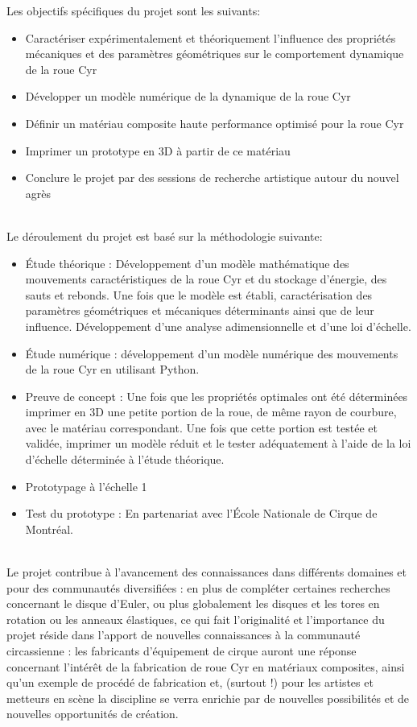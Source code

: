 Les objectifs spécifiques du projet sont les suivants:
\begin{itemize}
\item Caractériser expérimentalement et théoriquement l’influence des propriétés mécaniques et des paramètres géométriques sur le comportement dynamique de la roue Cyr
\item Développer un modèle numérique de la dynamique de la roue Cyr
\item Définir un matériau composite haute performance optimisé pour la roue Cyr
\item Imprimer un prototype en 3D à partir de ce matériau
\item Conclure le projet par des sessions de recherche artistique autour du nouvel agrès
\end{itemize}
\\
Le déroulement du projet est basé sur la méthodologie suivante:
\begin{itemize}
\item Étude théorique : Développement d’un modèle mathématique des mouvements caractéristiques de la roue Cyr et du stockage d’énergie, des sauts et rebonds. Une fois que le modèle est établi, caractérisation des paramètres géométriques et mécaniques déterminants ainsi que de leur influence. Développement d’une analyse adimensionnelle et d’une loi d’échelle.
\item Étude numérique : développement d’un modèle numérique des mouvements de la roue Cyr en utilisant Python.
\item Preuve de concept : Une fois que les propriétés optimales ont été déterminées imprimer en 3D une petite portion de la roue, de même rayon de courbure, avec le matériau correspondant. Une fois que cette portion est testée et validée, imprimer un modèle réduit et le tester adéquatement à l’aide de la loi d’échelle déterminée à l’étude théorique.
\item Prototypage à l’échelle 1
\item Test du prototype : En partenariat avec l’École Nationale de Cirque de Montréal.
\end{itemize}
\\
Le projet contribue à l’avancement des connaissances dans différents domaines et pour des communautés diversifiées : en plus de compléter certaines recherches concernant le disque d’Euler, ou plus globalement les disques et les tores en rotation ou les anneaux élastiques, ce qui fait l’originalité et l’importance du projet réside dans l’apport de nouvelles connaissances à la communauté circassienne : les fabricants d’équipement de cirque auront une réponse concernant l’intérêt de la fabrication de roue Cyr en matériaux composites, ainsi qu’un exemple de procédé de fabrication et, (surtout !) pour les artistes et metteurs en scène la discipline se verra enrichie par de nouvelles possibilités et de nouvelles opportunités de création.


